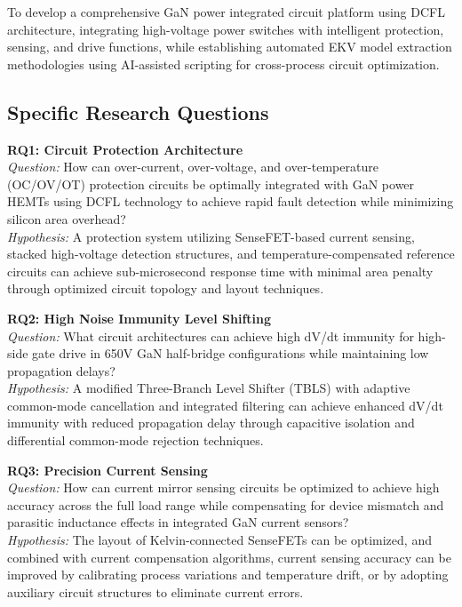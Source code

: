 \documentclass[12pt,a4paper]{article}
\begin{document}
To develop a comprehensive GaN power integrated circuit platform using DCFL architecture, integrating high-voltage power switches with intelligent protection, sensing, and drive functions, while establishing automated EKV model extraction methodologies using AI-assisted scripting for cross-process circuit optimization.

\subsection{Specific Research Questions}

\textbf{RQ1: Circuit Protection Architecture}\\
\textit{Question:} How can over-current, over-voltage, and over-temperature (OC/OV/OT) protection circuits be optimally integrated with GaN power HEMTs using DCFL technology to achieve rapid fault detection while minimizing silicon area overhead?\\
\textit{Hypothesis:} A protection system utilizing SenseFET-based current sensing, stacked high-voltage detection structures, and temperature-compensated reference circuits can achieve sub-microsecond response time with minimal area penalty through optimized circuit topology and layout techniques.

\textbf{RQ2: High Noise Immunity Level Shifting}\\
\textit{Question:} What circuit architectures can achieve high dV/dt immunity for high-side gate drive in 650V GaN half-bridge configurations while maintaining low propagation delays?\\
\textit{Hypothesis:} A modified Three-Branch Level Shifter (TBLS) with adaptive common-mode cancellation and integrated filtering can achieve enhanced dV/dt immunity with reduced propagation delay through capacitive isolation and differential common-mode rejection techniques.

\textbf{RQ3: Precision Current Sensing}\\
\textit{Question:} How can current mirror sensing circuits be optimized to achieve high accuracy across the full load range while compensating for device mismatch and parasitic inductance effects in integrated GaN current sensors?\\
\textit{Hypothesis:} The layout of Kelvin-connected SenseFETs can be optimized, and combined with current compensation algorithms, current sensing accuracy can be improved by calibrating process variations and temperature drift, or by adopting auxiliary circuit structures to eliminate current errors.
\end{document}
